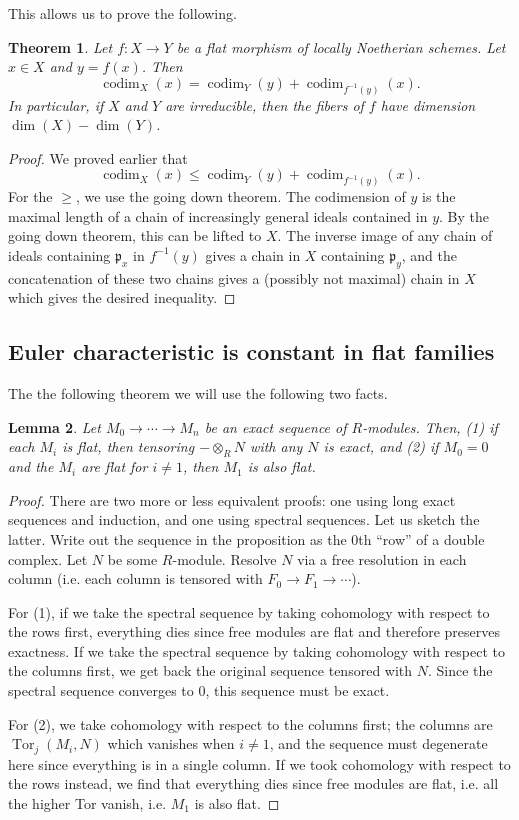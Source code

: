 \documentclass[10pt]{article}
\newtheorem{thm}{Theorem}[section]
\newtheorem{lemma}[thm]{Lemma}
\theoremstyle{definition}
\DeclareMathOperator{\codim}{codim}
\DeclareMathOperator{\Tor}{Tor}
\newcommand{\mf}{\mathfrak}
\begin{document}
This allows us to prove the following.
\begin{thm}
Let $f: X \rightarrow Y$ be a flat morphism of locally Noetherian schemes.  Let $x \in X$ and $y = f(x)$.  Then
$$\codim_X(x) = \codim_Y(y) + \codim_{f^{-1}(y)}(x).$$
In particular, if $X$ and $Y$ are irreducible, then the fibers of $f$ have dimension $\dim(X) - \dim(Y)$.
\end{thm}
\begin{proof}
We proved earlier that
$$\codim_X(x) \leq \codim_Y(y) + \codim_{f^{-1}(y)}(x).$$
For the $\geq$, we use the going down theorem.  The codimension of $y$ is the maximal length of a chain of increasingly general ideals contained in $y$.  By the going down theorem, this can be lifted to $X$.  The inverse image of any chain of ideals containing $\mf{p}_x$ in $f^{-1}(y)$ gives a chain in $X$ containing $\mf{p}_y$, and the concatenation of these two chains gives a (possibly not maximal) chain in $X$ which gives the desired inequality.
\end{proof}


\subsection{Euler characteristic is constant in flat families}


The the following theorem we will use the following two facts.
\begin{lemma}
Let $M_0 \rightarrow \cdots \rightarrow M_n$ be an exact sequence of $R$-modules.  Then, (1) if each $M_i$ is flat, then tensoring $- \otimes_R N$ with any $N$ is exact, and (2) if $M_0 = 0$ and the $M_i$ are flat for $i \ne 1$, then $M_1$ is also flat.
\end{lemma}
\begin{proof}
There are two more or less equivalent proofs: one using long exact sequences and induction, and one using spectral sequences.  Let us sketch the latter.  Write out the sequence in the proposition as the $0$th ``row'' of a double complex.  Let $N$ be some $R$-module.  Resolve $N$ via a free resolution in each column (i.e. each column is tensored with $F_0 \rightarrow F_1 \rightarrow \cdots$).  

For (1), if we take the spectral sequence by taking cohomology with respect to the rows first, everything dies since free modules are flat and therefore preserves exactness.  If we take the spectral sequence by taking cohomology with respect to the columns first, we get back the original sequence tensored with $N$.  Since the spectral sequence converges to $0$, this sequence must be exact.

For (2), we take cohomology with respect to the columns first; the columns are $\Tor_j(M_i, N)$ which vanishes when $i \ne 1$, and the sequence must degenerate here since everything is in a single column.  If we took cohomology with respect to the rows instead, we find that everything dies since free modules are flat, i.e. all the higher Tor vanish, i.e. $M_1$ is also flat. 
\end{proof}
\end{document}
